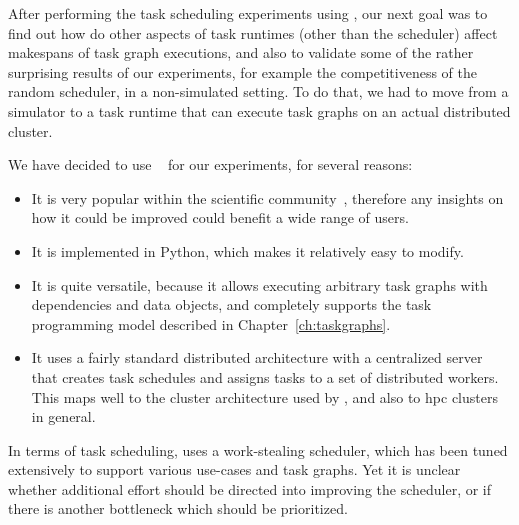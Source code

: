 
After performing the task scheduling experiments using \estee{}, our next goal
was to find out how do other aspects of task runtimes (other than the scheduler) affect makespans
of task graph executions, and also to validate some of the rather surprising results of our
experiments, for example the competitiveness of the random scheduler, in a non-simulated setting.
To do that, we had to move from a simulator to a task runtime that can execute task graphs on an
actual distributed cluster.

We have decided to use \dask{}~\cite{dask} for our experiments,
for several reasons:
\begin{itemize}
	\setlength\itemsep{0.1em}
	\item It is very popular within the scientific community~\cite{dask-user-survey}, therefore any
	      insights on how it could be improved could benefit a wide range of users.
	\item It is implemented in Python, which makes it relatively easy to modify.
	\item It is quite versatile, because it allows executing arbitrary task graphs with dependencies and data
	      objects, and completely supports the task programming model described in
	      Chapter~\ref{ch:taskgraphs}.
	\item It uses a fairly standard distributed architecture with a centralized server that creates task
	      schedules and assigns tasks to a set of distributed workers. This maps well to the cluster
	      architecture used by \estee{}, and also to \gls{hpc} clusters in
	      general.
\end{itemize}

In terms of task scheduling, \dask{} uses a work-stealing scheduler, which has
been tuned extensively to support various use-cases and task graphs. Yet it is unclear whether
additional effort should be directed into improving the scheduler, or if there is another
bottleneck which should be prioritized.

